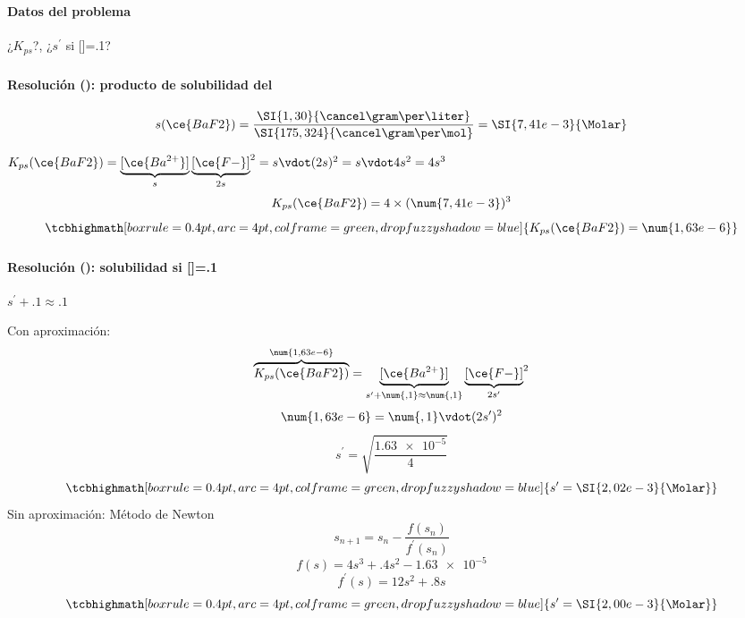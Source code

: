 
\begin{frame}
	\frametitle{\ejerciciocmd}
	\framesubtitle{Datos del problema}
	\begin{center}
		{\huge¿$K_{ps}$?, ¿$s^\prime$ si []=\SI{,1}{\Molar}?}\\[.3cm]
		\quad
	\end{center}
\end{frame}

\begin{frame}
	\frametitle{\ejerciciocmd}
	\framesubtitle{Resolución (): producto de solubilidad del }
	$$
		s(\ce{BaF2})=\frac{\SI{1,30}{\cancel\gram\per\liter}}{\SI{175,324}{\cancel\gram\per\mol}}=\SI{7,41e-3}{\Molar}
	$$
	\begin{center}
		\quad$K_{ps}(\ce{BaF2})=\underbrace{[\ce{Ba^{2+}}]}_{s}{\underbrace{[\ce{F-}]}_{2s}}^2=s\vdot(2s)^2=s\vdot 4s^2=4s^3$
		$$
			K_{ps}(\ce{BaF2})=4\times(\num{7,41e-3})^3
		$$
		$$
			\tcbhighmath[boxrule=0.4pt,arc=4pt,colframe=green,drop fuzzy shadow=blue]{K_{ps}(\ce{BaF2})=\num{1,63e-6}}
		$$
	\end{center}
\end{frame}

\begin{frame}
	\frametitle{\ejerciciocmd}
	\framesubtitle{Resolución (): solubilidad si []=\SI{,1}{\Molar}}
	 $s^\prime+\num{,1}\approx\num{,1}$
	\\
	\begin{multicols}{2}
		\alert{Con aproximación:}
			$$
				\overbrace{K_{ps}(\ce{BaF2})}^{\num{1,63e-6}}=\underbrace{[\ce{Ba^{2+}}]}_{s^\prime+\num{,1}\approx\num{,1}}{\underbrace{[\ce{F-}]}_{2s^\prime}}^2
			$$
			$$
				\num{1,63e-6}=\num{,1}\vdot(2s^\prime)^2
			$$
			$$
				s^\prime=\sqrt{\frac{\num{1,63e-5}}{4}}
			$$
			$$
				\tcbhighmath[boxrule=0.4pt,arc=4pt,colframe=green,drop fuzzy shadow=blue]{s^\prime=\SI{2,02e-3}{\Molar}}
			$$
		\alert{Sin aproximación:} Método de Newton
			$$
				s_{n+1} = s_n - \frac{f(s_n)}{f^\prime(s_n)}
			$$
			$$
				f(s) = \num{4}s^3 + \num{,4}s^2 -\num{1,63e-5}
			$$
			$$
				f^\prime(s) = \num{12}s^2 + \num{,8}s
			$$
			$$
				\tcbhighmath[boxrule=0.4pt,arc=4pt,colframe=green,drop fuzzy shadow=blue]{s^\prime=\SI{2,00e-3}{\Molar}}
			$$
	\end{multicols}
\end{frame}

